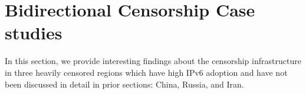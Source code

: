 \section{Bidirectional Censorship Case studies}
\label{sec:cases}
In this section, we provide interesting findings about the censorship
infrastructure in three heavily censored regions which have high IPv6 adoption
and have not been discussed in detail in prior sections: China, Russia, and
Iran.
